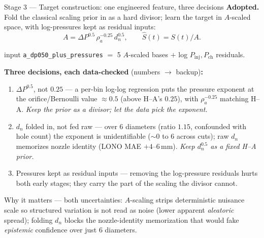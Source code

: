 \documentclass[aspectratio=169,11pt]{beamer}
\newcommand{\warn}[1]{\textcolor{warnRed}{#1}}
\newcommand{\blue}[1]{\textcolor{aaltoBlue}{#1}}
\begin{document}
\begin{frame}{Stage 3 --- Target construction: one engineered feature, three decisions}
\small
\textbf{Adopted.} Fold the classical scaling prior in as a hard divisor; learn the target in
$A$-scaled space, with log-pressures kept as residual inputs:
\[
  A=\Delta P^{0.5}\,\rho_a^{-0.25}\,d_n^{0.5},\qquad \hat S(t)=S(t)/A.
\]
\centerline{\footnotesize input \texttt{a\_dp050\_plus\_pressures} $=$ 5 $A$-scaled bases $+$ log $P_{\mathrm{inj}},P_{\mathrm{ch}}$ residuals.}

\vspace{0.4em}
\textbf{Three decisions, each data-checked} {\footnotesize(numbers $\to$ backup)}\textbf{:}
\begin{enumerate}\setlength\itemsep{3pt}\footnotesize
  \item \blue{$\Delta P^{0.5}$, not $0.25$} --- a per-bin log-log regression puts the pressure exponent at
        the orifice/Bernoulli value $\approx0.5$ (above H--A's $0.25$), with $\rho_a^{-0.25}$ matching H--A.
        \emph{Keep the prior as a divisor; let the data pick the exponent.}
  \item \blue{$d_n$ folded in, not fed raw} --- over 6 diameters (ratio $1.15$, confounded with hole
        count) the exponent is unidentifiable ($\sim\!0$ to $6$ across cuts); raw $d_n$ memorizes nozzle
        identity (\warn{LONO MAE $+4$--$6$\,mm}). \emph{Keep $d_n^{0.5}$ as a fixed H--A prior.}
  \item \blue{Pressures kept as residual inputs} --- removing the log-pressure residuals hurts both
        early stages; they carry the part of the scaling the divisor cannot.
\end{enumerate}

\vspace{0.3em}
{\footnotesize\blue{Why it matters --- both uncertainties:} $A$-scaling strips deterministic nuisance
scale so structured variation is not read as noise (lower apparent \emph{aleatoric} spread); folding
$d_n$ blocks the nozzle-identity memorization that would fake \emph{epistemic} confidence over just 6 diameters.}
\end{frame}
\end{document}
